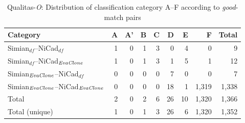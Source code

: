 \documentclass{sig-alternate-05-2015}
\begin{document}

\begin{table}
	\centering
	\caption{Qualitas-\textit{O}: Distribution of classification category A--F according to \textit{good}-match pairs}
	\label{tab:good_classification}
	\small
	\begin{tabular}{|l|r|r|r|r|r|r|r|r|}
		\hline 
		Category   & A   & 	A'   & 	B   & C   & D   &	E   &	F   & Total  \\
		\hline
		Simian$_{df}$--NiCad$_{df}$   & 1 & 0 & 1 & 3 & 0 & 4 & 0 & 9 \\
		Simian$_{df}$--NiCad$_{\textrm{\textit{EvaClone}}}$   & 1 & 0 & 1 & 3 & 1 & 5 & 1 & 12 \\
		Simian$_{\textrm{\textit{EvaClone}}}$--NiCad$_{df}$   & 0 & 0 & 0 & 0 & 7 & 0 & 0 & 7 \\
		Simian$_{\textrm{\textit{EvaClone}}}$--NiCad$_{\textrm{\textit{EvaClone}}}$   & 0 & 0 & 0 & 0 & 18 & 1 & 1,319 & 1,338 \\
		\hline
		Total   &   2   &   0   &  2   &  6   &   26   &   10   & 1,320  & 1,366 \\
		Total (unique)  &   1   &   0   &  1   &  3   &   26   &   6   & 1,320  & 1,352 \\
		\hline
	\end{tabular} 
\end{table}
\end{document}
